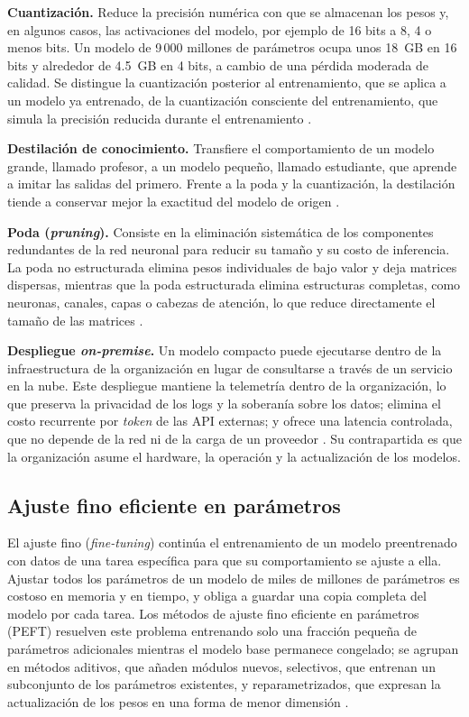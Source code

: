 \textbf{Cuantización.} Reduce la precisión numérica con que se almacenan los pesos y, en algunos casos, las activaciones del modelo, por ejemplo de 16 bits a 8, 4 o menos bits. Un modelo de 9\,000 millones de parámetros ocupa unos 18~GB en 16 bits y alrededor de 4.5~GB en 4 bits, a cambio de una pérdida moderada de calidad. Se distingue la cuantización posterior al entrenamiento, que se aplica a un modelo ya entrenado, de la cuantización consciente del entrenamiento, que simula la precisión reducida durante el entrenamiento \cite{wang2025_slm_survey}.

\textbf{Destilación de conocimiento.} Transfiere el comportamiento de un modelo grande, llamado profesor, a un modelo pequeño, llamado estudiante, que aprende a imitar las salidas del primero. Frente a la poda y la cuantización, la destilación tiende a conservar mejor la exactitud del modelo de origen \cite{yang2025_lightweight}.

\textbf{Poda (\textit{pruning}).} Consiste en la eliminación sistemática de los componentes redundantes de la red neuronal para reducir su tamaño y su costo de inferencia. La poda no estructurada elimina pesos individuales de bajo valor y deja matrices dispersas, mientras que la poda estructurada elimina estructuras completas, como neuronas, canales, capas o cabezas de atención, lo que reduce directamente el tamaño de las matrices \cite{wang2025_slm_survey}.

\textbf{Despliegue \textit{on-premise}.} Un modelo compacto puede ejecutarse dentro de la infraestructura de la organización en lugar de consultarse a través de un servicio en la nube. Este despliegue mantiene la telemetría dentro de la organización, lo que preserva la privacidad de los logs y la soberanía sobre los datos; elimina el costo recurrente por \textit{token} de las API externas; y ofrece una latencia controlada, que no depende de la red ni de la carga de un proveedor \cite{pardeshi2026_smartllm}. Su contrapartida es que la organización asume el hardware, la operación y la actualización de los modelos.

\subsection{Ajuste fino eficiente en parámetros}\label{sec:mt_peft}

El ajuste fino (\textit{fine-tuning}) continúa el entrenamiento de un modelo preentrenado con datos de una tarea específica para que su comportamiento se ajuste a ella. Ajustar todos los parámetros de un modelo de miles de millones de parámetros es costoso en memoria y en tiempo, y obliga a guardar una copia completa del modelo por cada tarea. Los métodos de ajuste fino eficiente en parámetros (PEFT) resuelven este problema entrenando solo una fracción pequeña de parámetros adicionales mientras el modelo base permanece congelado; se agrupan en métodos aditivos, que añaden módulos nuevos, selectivos, que entrenan un subconjunto de los parámetros existentes, y reparametrizados, que expresan la actualización de los pesos en una forma de menor dimensión \cite{han2024_peft_survey}.

